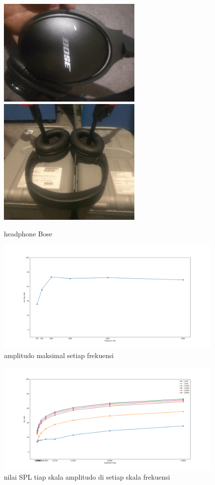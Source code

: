 \documentclass[12pt,]{article}
\begin{document}
	\begin{figure}[!ht]
		\centering
		\includegraphics[width=200pt]{hasil/bose/bose}
		\includegraphics[width=200pt]{hasil/bose/bose_setup}
		\caption{headphone Bose}
	\end{figure}

	\newpage
	\begin{figure}[!ht]
		\centering
		\includegraphics[width=500pt]{hasil/bose/maxallfreq/max_freq}
		\caption{amplitudo maksimal setiap frekuensi}
	\end{figure}
	
	\begin{figure}[!ht]
		\centering
		\includegraphics[width=500pt]{hasil/bose/maxallfreq/each_freq}
		\caption{nilai SPL tiap skala amplitudo di setiap skala frekuensi}
	\end{figure}
\end{document}
